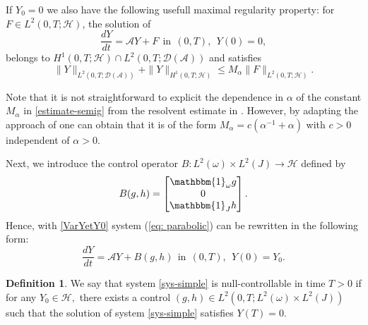 \documentclass[a4paper, 12pt]{article}
\theoremstyle{plain}
\theoremstyle{definition}
\newtheorem{definition}[theorem]{Definition}
\numberwithin{theorem}{section}
\numberwithin{equation}{section}
\begin{document}
If $Y_0=0$ we also have the following usefull maximal regularity property: for $F\in L^2(0,T;\mathscr{H})$, the solution of 
\begin{equation} \label{eq_forwardprob_semigroupform}
\frac{d Y}{dt}=\mathcal{A}Y+F~~\text{in}~~(0,T),~~Y(0)=0,
\end{equation}
belongs to $H^1(0,T;\mathscr{H})\cap L^2(0,T;\mathcal{D}(\mathcal{A}))$ and satisfies
\begin{equation}\label{estimate-semig}
  \|Y\|_{L^2(0,T;\mathcal{D}(\mathcal{A}))}+\|Y\|_{H^1(0,T; \mathscr{H})}\leq  M_\alpha \|F\|_{L^2(0,T; \mathscr{H})}.
\end{equation}
{Note that it is not straightforward to explicit the dependence in $\alpha$ of the constant $M_\alpha$ in \eqref{estimate-semig} from the resolvent estimate in \cite[Proposition 3.11]{MT}. However, by adapting the approach of \cite[Section 3]{M-T-2022} one can obtain that it is of the form $M_\alpha=c(\alpha^{-1}+\alpha)$ with $c>0$ independent of $\alpha>0$.

 
\smallskip

Next, we introduce the control operator $B:L^2(\omega)\times L^2(J)\to \mathscr{H}$ defined by
\begin{equation}\label{DefControlOperator}B(g,h)=\begin{bmatrix}
\mathbbm{1}_{\omega} g\\
0\\
\mathbbm{1}_{J} h \end{bmatrix}.
\end{equation}
Hence,  with \eqref{VarYetY0} system (\ref{eq: parabolic}) can be rewritten in the following form:
\begin{equation}\label{sys-simple}
\frac{d Y}{dt}=\mathcal{A}Y+B(g,h)~~\text{in}~~(0,T),~~Y(0)=Y_0.
\end{equation}

\begin{definition}
We say that system \eqref{sys-simple} is null-controllable in time $T>0$ if for any $Y_0\in\mathscr{H},$ there exists a control $(g,h)\in L^2(0,T; L^2(\omega)\times L^2(J))$ such that the solution of system \eqref{sys-simple} satisfies $Y(T)=0$.
\end{definition}


}
\end{document}
